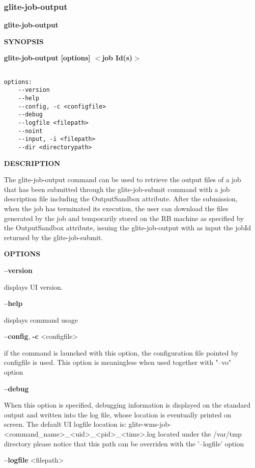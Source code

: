 \subsubsection{glite-job-output}
\label{glite-job-output}

\medskip
\textbf{glite-job-output}
\smallskip


\medskip
\textbf{SYNOPSIS}
\smallskip

\textbf{glite-job-output [options]  $<$job Id(s)$>$}
{\begin{verbatim}

options:
	--version
	--help
	--config, -c <configfile>
	--debug
	--logfile <filepath>
	--noint
	--input, -i <filepath>
	--dir <directorypath>
\end{verbatim}

\medskip
\textbf{DESCRIPTION}
\smallskip


The glite-job-output command can be used to retrieve the output files of a job that has been submitted through the glite-job-submit command with a job description file including the OutputSandbox attribute.
After the submission, when the job has terminated its execution, the user can download the files generated by the job and temporarily stored on the RB machine as specified by the OutputSandbox attribute, issuing the glite-job-output with as input the jobId returned by the glite-job-submit.

\medskip
\textbf{OPTIONS}
\smallskip

\textbf{--version}

displays UI version.

\textbf{--help}

displays command usage

\textbf{--config}, \textbf{-c} <configfile>

if the command is launched with this option, the configuration file pointed by configfile is used. This option is meaningless when used together with "--vo" option

\textbf{--debug}

When this option is specified, debugging information is displayed on the standard output and written into the log file, whose location is eventually printed on screen.
The default UI logfile location is:
glite-wms-job-<command\_name>\_<uid>\_<pid>\_<time>.log  located under the /var/tmp directory
please notice that this path can be overriden with the '--logfile' option

\textbf{--logfile} <filepath>

}
